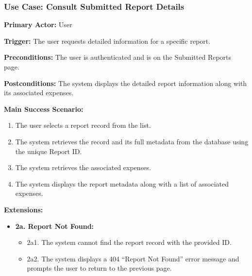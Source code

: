 \subsubsection{\textbf{Use Case: Consult Submitted Report Details}}

\textbf{Primary Actor:} User

\textbf{Trigger:} The user requests detailed information for a specific report.

\textbf{Preconditions:} The user is authenticated and is on the Submitted Reports page.

\textbf{Postconditions:} The system displays the detailed report information along with its associated expenses.

\vspace{0.5cm}

\textbf{Main Success Scenario:}

\begin{enumerate} [leftmargin=0.75cm, noitemsep]
\item The user selects a report record from the list.
\item The system retrieves the record and its full metadata from the database using the unique Report ID.
\item The system retrieves the associated expenses.
\item The system displays the report metadata along with a list of associated expenses.
\end{enumerate}

\vspace{5.3cm}

\textbf{Extensions:}

\begin{itemize} [label={}, leftmargin=0.75cm, noitemsep]

    \item \textbf{2a. Report Not Found:}
    \begin{itemize} [label={}, leftmargin=0.75cm, noitemsep]
        \item 2a1. The system cannot find the report record with the provided ID.
        \item 2a2. The system displays a 404 ``Report Not Found'' error message and prompts the user to return to the previous page.
    \end{itemize}

\end{itemize}

\vspace{0.3cm}

